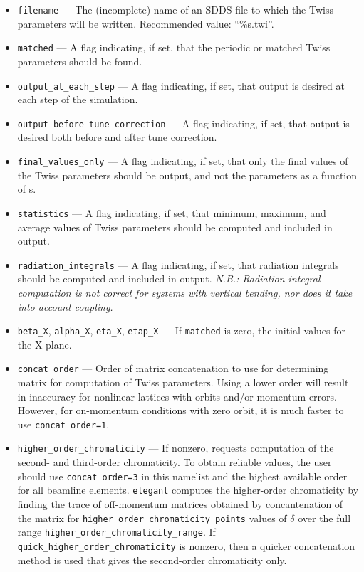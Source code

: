 \documentclass[11pt]{article}
\begin{document}
\begin{itemize}
\item \verb|filename| --- The (incomplete) name of an SDDS file to which the Twiss parameters will be written.
 Recommended value: ``\%s.twi''.
\item \verb|matched| --- A flag indicating, if set, that the periodic or matched Twiss parameters should be found.
\item \verb|output_at_each_step| --- A flag indicating, if set, that output is desired at each step of the simulation.
\item \verb|output_before_tune_correction| --- A flag indicating, if set, that output is desired both before and after
tune correction.
\item \verb|final_values_only| --- A flag indicating, if set, that only the final values of the Twiss parameters should
be output, and not the parameters as a function of s.
\item \verb|statistics| --- A flag indicating, if set, that minimum, maximum, and average values of
Twiss parameters should be computed and included in output.
\item \verb|radiation_integrals| --- A flag indicating, if set, that radiation integrals should be computed
and included in output. {\em N.B.: Radiation integral computation is not correct for systems with vertical
bending, nor does it take into account coupling.}
\item \verb|beta_X|, \verb|alpha_X|, \verb|eta_X|, \verb|etap_X| --- If \verb|matched| is zero, the initial values for
the X plane.

\item \verb|concat_order| --- Order of matrix concatenation to use for
determining matrix for computation of Twiss parameters.  Using a lower
order will result in inaccuracy for nonlinear lattices with orbits
and/or momentum errors.  However, for on-momentum conditions with zero
orbit, it is much faster to use \verb|concat_order=1|.

\item \verb|higher_order_chromaticity| --- If nonzero, requests
computation of the second- and third-order chromaticity.  To obtain
reliable values, the user should use \verb|concat_order=3| in this
namelist and the highest available order for all beamline elements.
{\tt elegant} computes the higher-order chromaticity by finding the
trace of off-momentum matrices obtained by concantenation of the
matrix for \verb|higher_order_chromaticity_points| values of $\delta$
over the full range \verb|higher_order_chromaticity_range|.
If \verb|quick_higher_order_chromaticity| is nonzero, then a quicker concatenation method is
used that gives the second-order chromaticity only.


\end{itemize}
\end{document}
